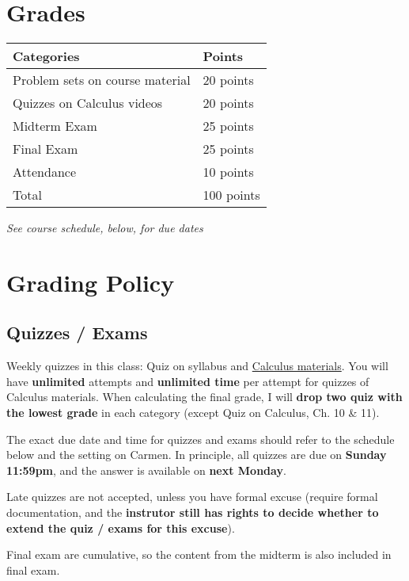 \documentclass[12pt]{article}
\begin{document}
\newpage

\section*{Grades}

\newlength\q
\setlength{}
\newlength\y
\setlength{}
\begin{tabular}{|p{\q}|p{\q}|}
    \hline
    Categories  & Points \\
    \hline
    \hline
    Problem sets on course material   & 20 points \\
    \hline
    Quizzes on Calculus videos & 20 points \\
    \hline
    Midterm Exam & 25 points \\
    \hline
    Final Exam & 25 points \\
    \hline
    Attendance & 10 points \\
    \hline
    Total & 100 points \\
    \hline
\end{tabular}
\textit{See course schedule, below, for due dates}


\section*{Grading Policy}

\subsection*{Quizzes / Exams}

Weekly quizzes in this class: Quiz on syllabus and \underline{Calculus materials}.
You will have \textbf{unlimited} attempts and \textbf{unlimited time} per attempt for quizzes of Calculus materials.
When calculating the final grade, I will \textbf{drop two quiz with the lowest grade} in each category (except Quiz on Calculus, Ch. 10 \& 11).

The exact due date and time for quizzes and exams should refer to the schedule below and the setting on Carmen.
In principle, all quizzes are due on \textbf{Sunday 11:59pm}, and the answer is available on \textbf{next Monday}.

Late quizzes are not accepted, unless you have formal excuse (require formal documentation, and the \textbf{instrutor still has rights to decide whether to extend the quiz / exams for this excuse}).

Final exam are cumulative, so the content from the midterm is also included in final exam.
\end{document}
